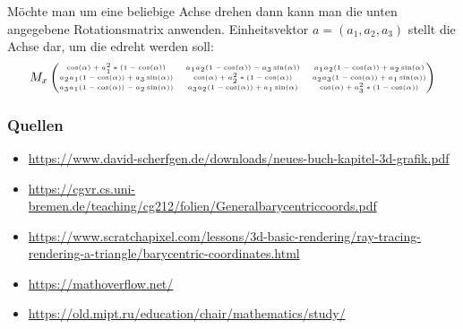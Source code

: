 \documentclass{beamer}
\begin{document}
\begin{frame}
	\frametitle{\phantom{}}
	\textmd{\small Möchte man um eine beliebige Achse drehen  dann kann man die unten angegebene Rotationsmatrix anwenden. Einheitsvektor $a=(a_{1},a_{2},a_{3})$ stellt die Achse dar, um die edreht werden soll: }
		\[
	\tiny
	M_{x}
	\begin{pmatrix}
		\cos(\alpha)+a_{1}^2*(1 - \cos(\alpha))  & a_{1}a_{2}(1 - \cos(\alpha)) - a_{3}\sin(\alpha)) & a_{1}a_{2}(1 - \cos(\alpha)) + a_{2}\sin(\alpha)\\
		a_{2}a_{1}(1 - \cos(\alpha)) + a_{3}\sin(\alpha)) & \cos(\alpha)+a_{2}^2*(1 - \cos(\alpha)) & a_{2}a_{3}(1 - \cos(\alpha)) + a_{1}\sin(\alpha)) \\
		a_{3}a_{1}(1 - \cos(\alpha)) - a_{2}\sin(\alpha)) & a_{3}a_{2}(1 - \cos(\alpha)) + a_{1}\sin(\alpha) & \cos(\alpha)+a_{3}^2*(1 - \cos(\alpha)) 
	\end{pmatrix}
	\]
\end{frame}

\begin{frame}
	\frametitle{Quellen}
	\begin{itemize}
		\small
		\item \href{https://www.david-scherfgen.de/downloads/neues-buch-kapitel-3d-grafik.pdf}{https://www.david-scherfgen.de/downloads/neues-buch-kapitel-3d-grafik.pdf}
		\item \href{https://cgvr.cs.uni-bremen.de/teaching/cg2_12/folien/Generalbarycentriccoords.pdf}{https://cgvr.cs.uni-bremen.de/teaching/cg212/folien/Generalbarycentriccoords.pdf}
		\item \href{https://www.scratchapixel.com/lessons/3d-basic-rendering/ray-tracing-rendering-a-triangle/barycentric-coordinates.html}{https://www.scratchapixel.com/lessons/3d-basic-rendering/ray-tracing-rendering-a-triangle/barycentric-coordinates.html}
		\item \href{https://mathoverflow.net/}{https://mathoverflow.net/}
		\item \href{https://old.mipt.ru/education/chair/mathematics/study/}{https://old.mipt.ru/education/chair/mathematics/study/}
	\end{itemize}
\end{frame}
\end{document}
